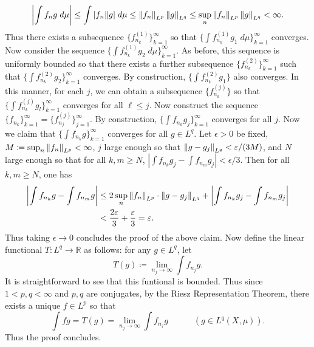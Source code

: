 \documentclass{article}
\begin{document}
\begin{enumerate}[itemsep =-2pt,label = (\alph{*})]
	\begin{equation*}
		\left| \int f_{n}g\;d\mu \right| \leq \int |f_{n}\|g|\;d\mu \leq \left\Vert f_{n} \right\Vert_{L^p}\left\Vert g \right\Vert_{L^q} \leq \sup_{n}\left\Vert f_{n} \right\Vert_{L^p}\left\Vert g \right\Vert_{L^q} < \infty. 
	\end{equation*}
	Thus there exists a subsequence $\{f^{(1)}_{n_{k}}\}_{k = 1}^{\infty}$ so that $\{\int f_{n_{k}}^{(1)}g_{1}\;d\mu\}_{k = 1}^{\infty}$ converges. Now consider the sequence $\{\int f_{n_{k}}^{(1)}g_{2}\;d\mu\}_{k = 1}^{\infty}$. As before, this sequence is uniformly bounded so that there exists a further subsequence $\{f_{n_{k}}^{(2)}\}_{k = 1}^{\infty}$ such that $\{\int f_{n_{k}}^{(2)}g_{2}\}_{k = 1}^{\infty}$ converges. By construction, $\{\int f_{n_{k}}^{(2)}g_{1}\}$ also converges. In this manner, for each $j$, we can obtain a subsequence $\{f_{n_{k}}^{(j)}\}$ so that $\{\int f_{n_{k}}^{(j)}g_{l}\}_{k = 1}^{\infty}$ converges for all $\ell \leq j$. Now construct the sequence $\{f_{n_{k}}\}_{k = 1}^{\infty} = \{f_{n_{j}}^{(j)}\}_{j = 1}^{\infty}$. By construction, $\{\int f_{n_{k}}g_{j}\}_{k = 1}^{\infty}$ converges for all $j$. Now we claim that $\{\int f_{n_{k}}g\}_{k =1}^{\infty}$ converges for all $g \in L^{q}$. Let $\epsilon > 0$ be fixed, $M \coloneqq \sup_{n}\left\Vert f_{n} \right\Vert_{L^p} < \infty$, $j$ large enough so that $\left\Vert g - g_{j} \right\Vert_{L^q} < \varepsilon/(3M)$, and $N$ large enough so that for all $k,m \geq N$, $|\int f_{n_{k}}g_{j} - \int f_{n_{m}}g_{j}| < \epsilon/3$. Then for all $k, m \geq N$, one has 
	\begin{align*}
		\begin{split}
			\left| \int f_{n_{k}}g - \int f_{n_{m}}g \right| &\leq 2\sup_{n}\left\Vert f_{n} \right\Vert_{L^p}\cdot \left\Vert g - g_{j} \right\Vert_{L^q} + \left| \int f_{n_{k}}g_{j} - \int f_{n_{m}}g_{j} \right| \\
			&< \frac{2\varepsilon}{3} + \frac{\varepsilon}{3} = \varepsilon. 
		\end{split}
	\end{align*}
	Thus taking $\epsilon \to 0$ concludes the proof of the above claim. Now define the linear functional $T: L^{q} \to\mathbb{R}$ as follows: for any $g \in L^q$, let 
	\begin{equation*}
		T(g) \coloneqq \lim_{n_{j} \to \infty}\int f_{n_{j}}g. 
	\end{equation*}
	It is straightforward to see that this funtional is bounded. Thus since $1 < p, q < \infty$ and $p,q$ are conjugates, by the Riesz Representation Theorem, there exists a unique $f \in L^p$ so that 
	\begin{equation*}
		\int fg = T(g) = \lim_{n_{j} \to \infty}\int f_{n_{j}}g \qquad \quad (g \in L^q(X,\mu)). 
	\end{equation*}
	Thus the proof concludes. 
\end{enumerate}
\end{document}
